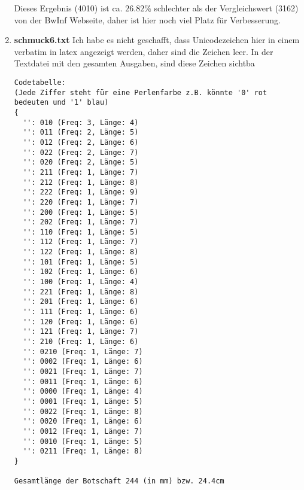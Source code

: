 \documentclass[a4paper,10pt,ngerman]{scrartcl}
\begin{document}
\begin{enumerate}
Dieses Ergebnis (4010) ist ca. $26.82\%$ schlechter als der Vergleichswert (3162) von der BwInf Webseite, daher ist hier noch viel Platz für Verbesserung.
  \item \textbf{schmuck6.txt}
  Ich habe es nicht geschafft, dass Unicodezeichen hier in einem verbatim in latex angezeigt werden,
daher sind die Zeichen leer. In der Textdatei mit den gesamten Ausgaben, sind diese Zeichen
sichtba
\begin{verbatim}
Codetabelle:
(Jede Ziffer steht für eine Perlenfarbe z.B. könnte '0' rot bedeuten und '1' blau)
{
  '': 010 (Freq: 3, Länge: 4)
  '': 011 (Freq: 2, Länge: 5)
  '': 012 (Freq: 2, Länge: 6)
  '': 022 (Freq: 2, Länge: 7)
  '': 020 (Freq: 2, Länge: 5)
  '': 211 (Freq: 1, Länge: 7)
  '': 212 (Freq: 1, Länge: 8)
  '': 222 (Freq: 1, Länge: 9)
  '': 220 (Freq: 1, Länge: 7)
  '': 200 (Freq: 1, Länge: 5)
  '': 202 (Freq: 1, Länge: 7)
  '': 110 (Freq: 1, Länge: 5)
  '': 112 (Freq: 1, Länge: 7)
  '': 122 (Freq: 1, Länge: 8)
  '': 101 (Freq: 1, Länge: 5)
  '': 102 (Freq: 1, Länge: 6)
  '': 100 (Freq: 1, Länge: 4)
  '': 221 (Freq: 1, Länge: 8)
  '': 201 (Freq: 1, Länge: 6)
  '': 111 (Freq: 1, Länge: 6)
  '': 120 (Freq: 1, Länge: 6)
  '': 121 (Freq: 1, Länge: 7)
  '': 210 (Freq: 1, Länge: 6)
  '': 0210 (Freq: 1, Länge: 7)
  '': 0002 (Freq: 1, Länge: 6)
  '': 0021 (Freq: 1, Länge: 7)
  '': 0011 (Freq: 1, Länge: 6)
  '': 0000 (Freq: 1, Länge: 4)
  '': 0001 (Freq: 1, Länge: 5)
  '': 0022 (Freq: 1, Länge: 8)
  '': 0020 (Freq: 1, Länge: 6)
  '': 0012 (Freq: 1, Länge: 7)
  '': 0010 (Freq: 1, Länge: 5)
  '': 0211 (Freq: 1, Länge: 8)
}

Gesamtlänge der Botschaft 244 (in mm) bzw. 24.4cm


\end{verbatim}
\end{enumerate}
\end{document}
